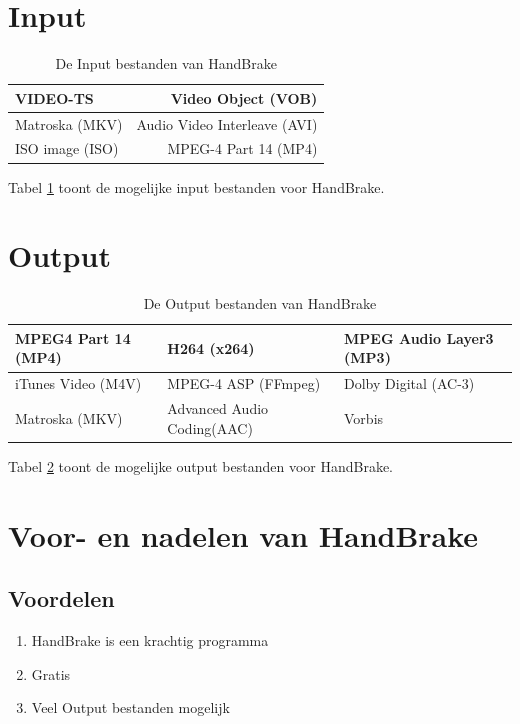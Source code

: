 \documentclass[12pt,a4paper]{article}
\begin{document}
\begin{titlepage}
\begin{center}
\section{Input}
\begin{table}[h!b!p!]
\caption{De Input bestanden van HandBrake \label{Input}}
\begin{center}
\begin{tabular}{|l|r|}
\hline
VIDEO-TS & Video Object (VOB)\\\hline
Matroska (MKV) & Audio Video Interleave (AVI)\\\hline
ISO image (ISO) & MPEG-4 Part 14 (MP4)\\\hline


\end{tabular}
\end{center}
\end{table}
Tabel \ref{Input} toont de mogelijke input bestanden voor HandBrake.

\section{Output}
\begin{table}[h!b!p!]
\caption{De Output bestanden van HandBrake \label{Output}}
\begin{center}
\begin{tabular}{|l|l|l|}
\hline
MPEG4 Part 14 (MP4) & H264 (x264) & MPEG Audio Layer3 (MP3)\\\hline
iTunes Video (M4V) & MPEG-4 ASP (FFmpeg) & Dolby Digital (AC-3)\\\hline
Matroska (MKV) & Advanced Audio Coding(AAC) & Vorbis\\\hline

\end{tabular}
\end{center}
\end{table}
Tabel \ref{Output} toont de mogelijke output bestanden voor HandBrake.

\pagebreak
\section{Voor- en nadelen van HandBrake}
\subsection{Voordelen}
\begin{enumerate}
\item HandBrake is een krachtig programma
\item Gratis 
\item Veel Output bestanden mogelijk
\end{enumerate}


\end{center}
\end{titlepage}
\end{document}
